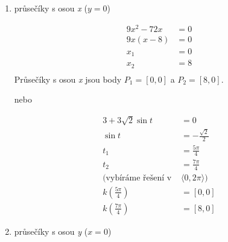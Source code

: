 		\begin{enumerate}
			\item průsečíky s osou \textit{x} ($y=0$)
			      				      			
			      \noindent\begin{minipage}[t]{0.5\textwidth}
			      \begin{align*}
			      	9x^2-72x & = 0 \\
			      	9x(x-8)  & = 0 \\
			      	x_1      & = 0 \\
			      	x_2      & = 8 \\
			      \end{align*}
			      Průsečíky s osou \textit{x} jsou body $P_1=[0,0]$ a $P_2=[8,0]$.
			\end{minipage}
			nebo
			\noindent\begin{minipage}[t]{0.5\textwidth}
			\begin{align*}
				3+3\sqrt{2}\sin{t}              & = 0                           \\
				\sin{t}                         & = -\frac{\sqrt{2}}{2}         \\
				t_1                             & = \frac{5\pi}{4}              \\
				t_2                             & = \frac{7\pi}{4}              \\
				\text{(vybíráme řešení v } & \langle0, 2\pi\rangle\text{)} \\
				k\left(\frac{5\pi}{4}\right)    & = [0, 0]                      \\
				k\left(\frac{7\pi}{4}\right)    & = [8, 0]                      
			\end{align*}
			\end{minipage}		
			\item průsečíky s osou \textit{y} ($x=0$)
			      				      			

\end{enumerate}
